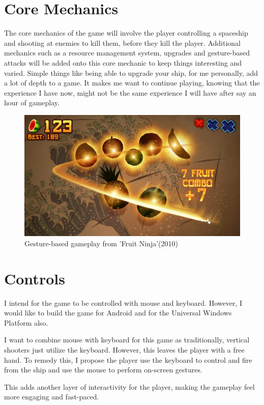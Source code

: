 \documentclass[a4paper]{scrreprt}
\begin{document}
\section{Core Mechanics}
The core mechanics of the game will involve the player controlling a spaceship and shooting at enemies to kill them, before they kill the player. Additional mechanics such as a resource management system, upgrades
and gesture-based attacks will be added onto this core mechanic to keep things interesting and varied. Simple things like being able to upgrade your ship, for me personally, add a lot 
of depth to a game. It makes me want to continue playing, knowing that the experience I have now, might not be the same experience I will have after say an hour of gameplay.
\begin{figure}[h!]
  \centering
  \includegraphics[width=1\textwidth]{FruitNinja}
  \caption{Gesture-based gameplay from 'Fruit Ninja'(2010)}
  \end{figure}

\clearpage
\section{Controls}
I intend for the game to be controlled with mouse and keyboard. However, I would like to build the game for Android and for the Universal Windows Platform also.

I want to combine mouse with keyboard for this game as traditionally, vertical shooters just utilize the keyboard. However, this leaves the player with a free hand. To remedy this, I propose the player use the keyboard to control and fire from the ship and use the mouse to perform on-screen gestures.

This adds another layer of interactivity for the player, making the gameplay feel more engaging and fast-paced.
\end{document}
